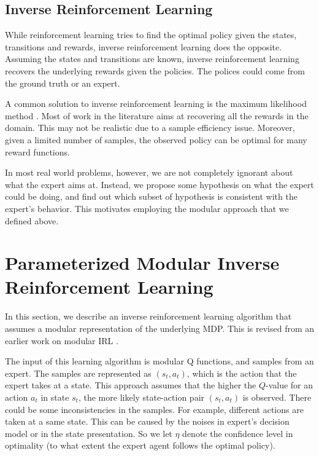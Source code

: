 \documentclass[12pt]{report}	%
\theoremstyle{definition}
\theoremstyle{remark}
\providecommand{\DIFadd}[1]{{\protect\color{blue}\uwave{#1}}} %
\providecommand{\DIFaddbegin}{} %
\providecommand{\DIFaddend}{} %
\begin{document}
\subsection{Inverse Reinforcement Learning}

While reinforcement learning tries to find the optimal policy given the states,
transitions and rewards, inverse reinforcement learning does the opposite.
Assuming the states and transitions are known, inverse reinforcement learning
recovers the underlying rewards given the policies. The polices could come from
the ground truth or an expert.

A common solution to inverse reinforcement learning is the maximum likelihood
method \cite{abbeel2004apprenticeship}. Most of work in the literature aims at recovering all the rewards in the
domain. This may not be realistic due to a sample efficiency issue. Moreover,
given a limited number of samples, the observed policy can be optimal for many
reward functions. 

In most real world problems, however, we are not completely ignorant
about what the expert aims at. Instead, we propose some hypothesis on what the
expert could be doing, and find out which subset of hypothesis is consistent
with the expert's behavior. This motivates employing the modular approach that
we defined above.

\section{Parameterized Modular Inverse Reinforcement Learning}

In this section, we describe an inverse reinforcement learning algorithm that
assumes a modular representation of the underlying MDP. This is revised from an
earlier work on modular IRL \cite{rothkopf2013modular}.

The input of this learning algorithm is modular Q functions, and samples
from an expert. The samples are represented as $(s_t, a_t)$, which is the
action that the expert takes at a state.
This approach assumes that the higher the $Q$-value
for an action $a_t$ in state $s_t$, the more likely \DIFaddbegin \DIFadd{the }\DIFaddend state-action pair
$(s_t,a_t)$ is observed. There could be some inconsistencies in the samples. For
example, different actions are taken at a same state. This can be caused by the
noises in expert's decision model or in the state presentation. So we let $\eta$
denote the confidence level in optimality (to what extent the expert agent follows
the optimal policy).
\end{document}

